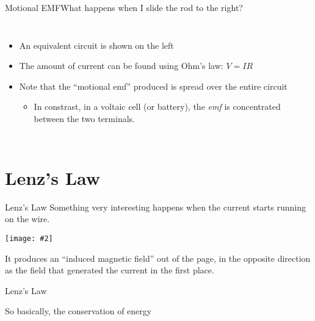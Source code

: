 \documentclass[12pt,aspectratio=169]{beamer}
\newcommand{\pic}[2]{\texttt{[image: \#2]}}
\begin{document}
\begin{frame}{Motional EMF}{What happens when I slide the rod to the right?}
  \begin{columns}
    
    \begin{itemize}
    \item An equivalent circuit is shown on the left
    \item The amount of current can be found using Ohm's law: $V=IR$
    \item Note that the ``motional emf'' produced is spread over the entire
      circuit
      \begin{itemize}
      \item In constrast, in a voltaic cell (or battery), the \emph{emf} is
        concentrated between the two terminals.
      \end{itemize}
    \end{itemize}
  \end{columns}
\end{frame}



\section{Lenz's Law}

\begin{frame}{Lenz's Law}
  Something very interesting happens when the current starts running on the
  wire.
  \begin{center}
    \pic{.35}{motional-emf-2}
  \end{center}
  It produces an ``induced magnetic field'' out of the page, in the opposite
  direction as the field that generated the current in the first place.
\end{frame}



\begin{frame}{Lenz's Law}
  \begin{center}
  \end{center}

  \vspace{.2in}So basically, the conservation of energy
\end{frame}
\end{document}
